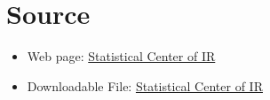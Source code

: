 \documentclass[fleqn]{report}
\begin{document}
\chapter*{Source}
\begin{itemize}
    \item Web page: \href{https://www.amar.org.ir/%D9%BE%D8%A7%DB%8C%DA%AF%D8%A7%D9%87-%D9%87%D8%A7-%D9%88-%D8%B3%D8%A7%D9%85%D8%A7%D9%86%D9%87-%D9%87%D8%A7/%D8%B3%D8%B1%DB%8C%D9%87%D8%A7%DB%8C-%D8%B2%D9%85%D8%A7%D9%86%DB%8C/agentType/ViewType/PropertyTypeID/2061}{Statistical Center of IR}
    \item Downloadable File: \href{https://www.amar.org.ir/Portals/0/PropertyAgent/461/Files/9348/2302n220440104.xlsx}{Statistical Center of IR}
\end{itemize}

 
\end{document}
